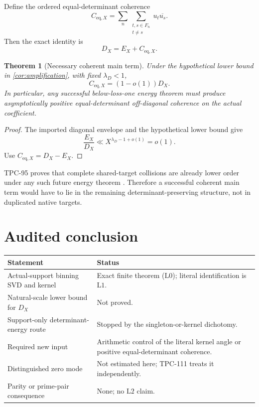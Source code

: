 \documentclass[11pt,a4paper]{article}
\newtheorem{theorem}{Theorem}[section]
\theoremstyle{definition}
\theoremstyle{remark}
\newcommand{\Lzero}{\mathrm{L0}}
\newcommand{\Lone}{\mathrm{L1}}
\newcommand{\Ltwo}{\mathrm{L2}}
\begin{document}
Define the ordered equal-determinant coherence
\[
 C_{\mathrm{eq},X}
 =\sum_n\sum_{\substack{t,s\in F_n\\t\ne s}}
 u_t\overline{u_s}.
\]
Then the exact identity is
\[
 D_X=E_X+C_{\mathrm{eq},X}.
\]

\begin{theorem}[Necessary coherent main term]
\label{thm:coherence}
Under the hypothetical lower bound in
\cref{cor:amplification}, with fixed \(\lambda_D<1\),
\[
 C_{\mathrm{eq},X}=(1-o(1))D_X.
\]
In particular, any successful below-loss-one energy theorem must
produce asymptotically positive equal-determinant off-diagonal
coherence on the actual coefficient.
\end{theorem}

\begin{proof}
The imported diagonal envelope and the hypothetical lower bound give
\[
 \frac{E_X}{D_X}\ll X^{\lambda_D-1+o(1)}=o(1).
\]
Use \(C_{\mathrm{eq},X}=D_X-E_X\).
\end{proof}

TPC-95 proves that complete shared-target collisions are already
lower order under any such future energy theorem
\citep{WangTPC95}.  Therefore a successful coherent main term would
have to lie in the remaining determinant-preserving structure, not
in duplicated native targets.

\section{Audited conclusion}

\begin{center}
\small
\begin{tabularx}{\textwidth}{@{}p{}X@{}}
\toprule
Statement & Status\\
\midrule
Actual-support binning SVD and kernel
& Exact finite theorem (\(\Lzero\)); literal identification is
\(\Lone\).\\
Natural-scale lower bound for \(D_X\)
& Not proved.\\
Support-only determinant-energy route
& Stopped by the singleton-or-kernel dichotomy.\\
Required new input
& Arithmetic control of the literal kernel angle or positive
equal-determinant coherence.\\
Distinguished zero mode
& Not estimated here; TPC-111 treats it independently.\\
Parity or prime-pair consequence
& None; no \(\Ltwo\) claim.\\
\bottomrule
\end{tabularx}
\end{center}
\end{document}
